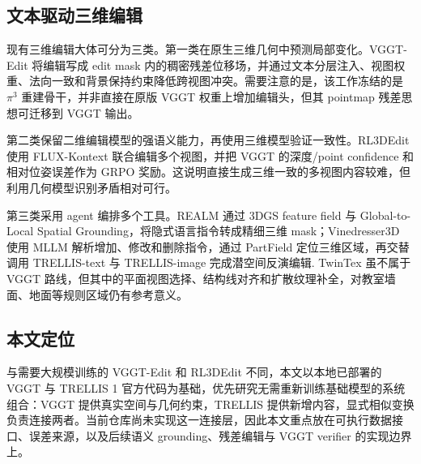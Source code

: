 \subsection{文本驱动三维编辑}

现有三维编辑大体可分为三类。第一类在原生三维几何中预测局部变化。VGGT-Edit 将编辑写成 edit mask 内的稠密残差位移场，并通过文本分层注入、视图权重、法向一致和背景保持约束降低跨视图冲突\cite{vggtedit}。需要注意的是，该工作冻结的是 $\pi^3$ 重建骨干，并非直接在原版 VGGT 权重上增加编辑头，但其 pointmap 残差思想可迁移到 VGGT 输出。

第二类保留二维编辑模型的强语义能力，再使用三维模型验证一致性。RL3DEdit 使用 FLUX-Kontext 联合编辑多个视图，并把 VGGT 的深度/point confidence 和相对位姿误差作为 GRPO 奖励\cite{rl3dedit}。这说明直接生成三维一致的多视图内容较难，但利用几何模型识别矛盾相对可行。

第三类采用 agent 编排多个工具。REALM 通过 3DGS feature field 与 Global-to-Local Spatial Grounding，将隐式语言指令转成精细三维 mask\cite{realm}；Vinedresser3D 使用 MLLM 解析增加、修改和删除指令，通过 PartField 定位三维区域，再交替调用 TRELLIS-text 与 TRELLIS-image 完成潜空间反演编辑\cite{vinedresser}. TwinTex 虽不属于 VGGT 路线，但其中的平面视图选择、结构线对齐和扩散纹理补全，对教室墙面、地面等规则区域仍有参考意义\cite{twintex}。

\subsection{本文定位}

与需要大规模训练的 VGGT-Edit 和 RL3DEdit 不同，本文以本地已部署的 VGGT 与 TRELLIS 1 官方代码为基础，优先研究无需重新训练基础模型的系统组合：VGGT 提供真实空间与几何约束，TRELLIS 提供新增内容，显式相似变换负责连接两者。当前仓库尚未实现这一连接层，因此本文重点放在可执行数据接口、误差来源，以及后续语义 grounding、残差编辑与 VGGT verifier 的实现边界上。
